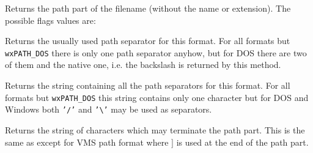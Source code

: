 Returns the path part of the filename (without the name or extension). The
possible flags values are:

\twocolwidtha{5cm}
\begin{twocollist}\itemsep=0pt
\end{twocollist}


\label{wxfilenamegetpathseparator}


Returns the usually used path separator for this format. For all formats but 
{\tt wxPATH\_DOS} there is only one path separator anyhow, but for DOS there
are two of them and the native one, i.e. the backslash is returned by this
method.




\label{wxfilenamegetpathseparators}


Returns the string containing all the path separators for this format. For all
formats but {\tt wxPATH\_DOS} this string contains only one character but for
DOS and Windows both {\tt '/'} and {\tt '\textbackslash'} may be used as
separators.




\label{wxfilenamegetpathterminators}


Returns the string of characters which may terminate the path part. This is the
same as  except for VMS
path format where $]$ is used at the end of the path part.


\label{wxfilenamegetshortpath}

